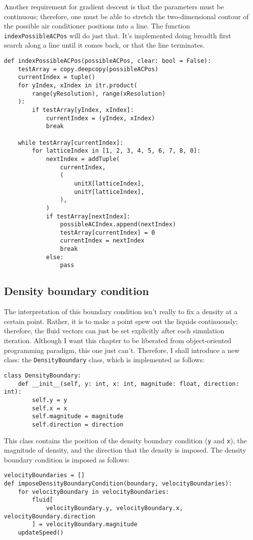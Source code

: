 Another requirement for gradient descent is that the parameters must be continuous; therefore, one must be able to stretch the two-dimensional contour of the possible air conditioner positions into a line. The function \texttt{indexPossibleACPos} will do just that. It's implemented doing breadth first search along a line until it comes back, or that the line terminates.
\begin{verbatim}
def indexPossibleACPos(possibleACPos, clear: bool = False):
    testArray = copy.deepcopy(possibleACPos)
    currentIndex = tuple()
    for yIndex, xIndex in itr.product(
        range(yResolution), range(xResolution)
    ):
        if testArray[yIndex, xIndex]:
            currentIndex = (yIndex, xIndex)
            break

    while testArray[currentIndex]:
        for latticeIndex in [1, 2, 3, 4, 5, 6, 7, 8, 0]:
            nextIndex = addTuple(
                currentIndex,
                (
                    unitX[latticeIndex],
                    unitY[latticeIndex],
                ),
            )
            if testArray[nextIndex]:
                possibleACIndex.append(nextIndex)
                testArray[currentIndex] = 0
                currentIndex = nextIndex
                break
            else:
                pass
\end{verbatim}

\subsection{Density boundary condition}

The interpretation of this boundary condition isn't really to fix a density at a certain point. Rather, it is to make a point spew out the liquids continuously; therefore, the fluid vectors can just be set explicitly after each simulation iteration. Although I want this chapter to be liberated from object-oriented programming paradigm, this one just can't. Therefore, I shall introduce a new class: the \texttt{DensityBoundary} class, which is implemented as follows:
\begin{verbatim}
class DensityBoundary:
    def __init__(self, y: int, x: int, magnitude: float, direction: int):
        self.y = y
        self.x = x
        self.magnitude = magnitude
        self.direction = direction
\end{verbatim}
This class contains the position of the density boundary condition (\texttt{y} and \texttt{x}), the magnitude of density, and the direction that the density is imposed. The density boundary condition is imposed as follows:
\begin{verbatim}
velocityBoundaries = []
def imposeDensityBoundaryCondition(boundary, velocityBoundaries):
    for velocityBoundary in velocityBoundaries:
        fluid[
            velocityBoundary.y, velocityBoundary.x, velocityBoundary.direction
        ] = velocityBoundary.magnitude
    updateSpeed()
\end{verbatim}

